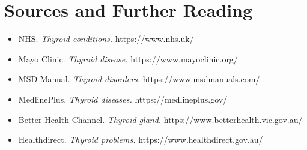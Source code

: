 \section*{Sources and Further Reading}
\begin{itemize}
    \item NHS. \textit{Thyroid conditions.} https://www.nhs.uk/
    \item Mayo Clinic. \textit{Thyroid disease.} https://www.mayoclinic.org/
    \item MSD Manual. \textit{Thyroid disorders.} https://www.msdmanuals.com/
    \item MedlinePlus. \textit{Thyroid diseases.} https://medlineplus.gov/
    \item Better Health Channel. \textit{Thyroid gland.} https://www.betterhealth.vic.gov.au/
    \item Healthdirect. \textit{Thyroid problems.} https://www.healthdirect.gov.au/
\end{itemize}
